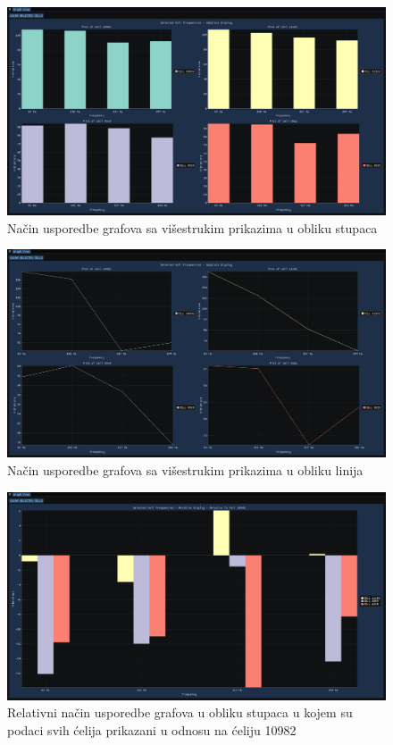 \documentclass[times, utf8, diplomski]{fer}
\begin{document}
\begin{figure}[H]
	\centering
	\includegraphics[width=\textwidth]{subplots_graph_display_bars.png}
	\caption{Način usporedbe grafova sa višestrukim prikazima u obliku stupaca}
    \label{appendix:subplots_graph_display_bars}
\end{figure}

\begin{figure}[H]
	\centering
	\includegraphics[width=\textwidth]{subplots_graph_display_lines.png}
	\caption{Način usporedbe grafova sa višestrukim prikazima u obliku linija}
    \label{appendix:subplots_graph_display_lines}
\end{figure}

\begin{figure}[H]
	\centering
	\includegraphics[width=\textwidth]{relative_graph_display_bars_cell_10982.png}
	\caption{Relativni način usporedbe grafova u obliku stupaca u kojem su podaci svih ćelija prikazani u odnosu na ćeliju 10982}
    \label{appendix:relative_graph_display_bars}
\end{figure}
\end{document}

